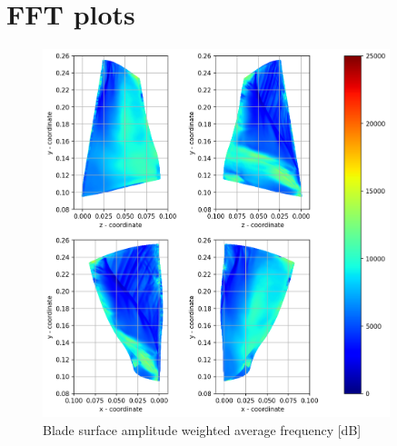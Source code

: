 
\chapter{FFT plots} %

\label{fft_results} %


\begin{figure}[ht]
	\centering
	\includegraphics[width=0.9\textwidth]{Figures/blade-awf.png}
    \caption{Blade surface amplitude weighted average frequency [dB]} \label{blade-awaf}
\end{figure}	

